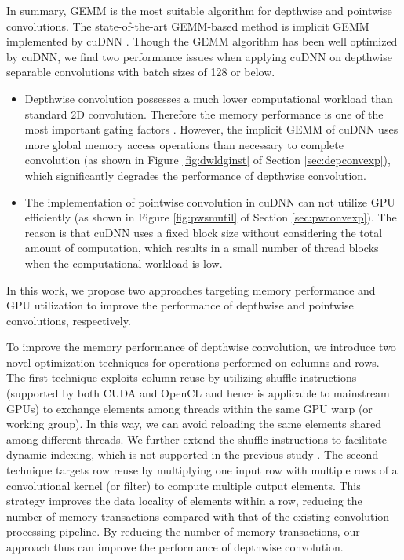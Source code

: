 In summary, GEMM is the most suitable algorithm for depthwise and pointwise convolutions.
The state-of-the-art GEMM-based method is implicit GEMM implemented by cuDNN \cite{ChetlurWVCTCS14}.
Though the GEMM algorithm has been well optimized by cuDNN, we find two performance issues when applying cuDNN on depthwise separable convolutions with batch sizes of 128 or below.
\begin{itemize}
    \item Depthwise convolution possesses a much lower computational workload than standard 2D convolution. Therefore the memory performance is one of the most important gating factors \cite{cudaperformance}. 
    However, the implicit GEMM of cuDNN uses more global memory access operations than necessary to complete convolution (as shown in Figure \ref{fig:dwldginst} of Section \ref{sec:depconvexp}), which significantly degrades the performance of depthwise convolution.
    \item The implementation of pointwise convolution in cuDNN can not utilize GPU efficiently (as shown in Figure \ref{fig:pwsmutil} of Section \ref{sec:pwconvexp}).
    The reason is that cuDNN uses a fixed block size without considering the total amount of computation, which results in a small number of thread blocks when the computational workload is low. 
\end{itemize}
In this work, we propose two approaches targeting memory performance and GPU utilization to improve the performance of depthwise and pointwise convolutions, respectively. 

To improve the memory performance of depthwise convolution, we introduce two novel optimization techniques for operations performed on columns and rows. 
The first technique exploits column reuse by utilizing shuffle instructions (supported by both CUDA and OpenCL and hence is applicable to mainstream GPUs) to exchange elements among threads within the same GPU warp (or working group). 
In this way, we can avoid reloading the same elements shared among different threads. 
We further extend the shuffle instructions to facilitate dynamic indexing, which is not supported in the previous study \cite{vasilache2014fast}. 
The second technique targets row reuse by multiplying one input row with multiple rows of a convolutional kernel (or filter) to compute multiple output elements. 
This strategy improves the data locality of elements within a row, reducing the number of memory transactions compared with that of the existing convolution processing pipeline. 
By reducing the number of memory transactions, our approach thus can improve the performance of depthwise convolution.

